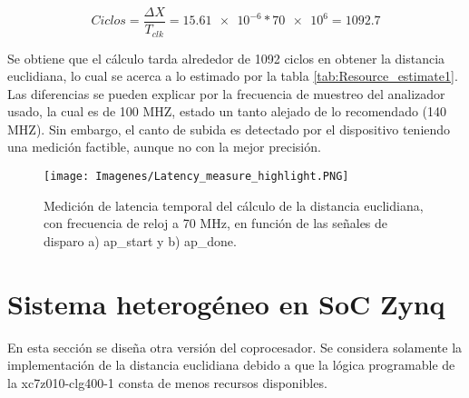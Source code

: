 \documentclass[conference]{IEEEtran}
\begin{document}
\begin{equation*}
    Ciclos=\frac{\Delta X}{T_{clk}} =\num{15.61e-6}*\num{70e6}=1092.7
\end{equation*}

Se obtiene que el cálculo tarda alrededor de 1092 ciclos en obtener la distancia euclidiana, lo cual se acerca a lo estimado por la tabla \ref{tab:Resource_estimate1}. Las diferencias se pueden explicar por la frecuencia de muestreo del analizador usado, la cual es de 100 MHZ, estado un tanto alejado de lo recomendado (140 MHZ). Sin embargo, el canto de subida es detectado por el dispositivo teniendo una medición factible, aunque no con la mejor precisión.
\begin{figure}[h]
    \centering
    \texttt{[image: Imagenes/Latency\_measure\_highlight.PNG]}
    \caption{Medición de latencia temporal del cálculo de la distancia euclidiana, con frecuencia de reloj a 70 MHz, en función de las señales de disparo a) ap\_start y b) ap\_done. }
    \label{fig:latency_measure}
\end{figure}

  \section{Sistema heterogéneo en SoC Zynq}

 En esta sección se diseña otra  versión del coprocesador. Se considera solamente la implementación de la distancia euclidiana debido a que la lógica programable de la xc7z010-clg400-1 consta de menos recursos disponibles. 
\end{document}
